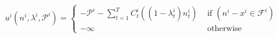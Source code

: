 \documentclass[runningheads]{llncs}
\newcommand{\li}[1][]{x^i_{#1}}
\newcommand{\oi}[1][]{n^i_{#1}}
\newcommand{\bai}[1][]{s^i_{#1}}
\newcommand{\ci}[1][]{C^i_{#1}}
\newcommand{\pbi}[1][]{\beta^i_{#1}}
\newcommand{\pzi}[1][]{\zeta^i_{#1}}
\newcommand{\fsi}{\mathcal{F}^i}
\newcommand{\storagei}{\mathbf{S}^i}
\newcommand{\guari}{\alpha^i}
\newcommand{\pri}[1][]{\lambda^i_{#1}}
\newcommand{\gaini}[1][]{\mathcal{P}^i_{#1}}
\newcommand{\uti}{u^i}
\begin{document}


\begin{equation}
    \label{eq:utility}
\uti(\oi, \pri, \gaini) =  \begin{cases}

    -\gaini - \sum^{T}_{t=1}  \ci[t]((1 - \pri[t])\oi[t])  & \text{ if } (\oi - \li \in \fsi) \\
    - \infty & \text{ otherwise}

    \end{cases}  
\end{equation}






\end{document}
